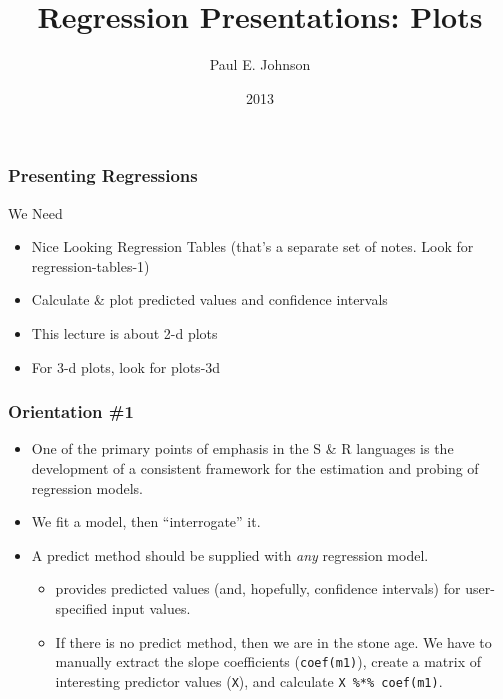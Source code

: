 \documentclass[10pt,english]{beamer}
\def\lyxframeend{} %
\def\Sweavesize{\normalsize}
\def\Rcolor{\color{black}}
\def\Rbackground{\color[gray]{0.95}}
\newcommand\makebeamertitle{\frame{\maketitle}}%
\begin{document}

\def\Sweavesize{\scriptsize} 
\def\Rcolor{\color{black}} 
\def\Rbackground{\color[gray]{0.97}}




\title[Descriptive]{Regression Presentations: Plots }


\author{Paul E. Johnson \and {}}




\date[2013]{2013}

\makebeamertitle

\lyxframeend{}


\begin{frame}

\frametitle{Presenting Regressions}

We Need
\begin{itemize}
\item Nice Looking Regression Tables (that's a separate set of notes. Look
for regression-tables-1)
\item Calculate \& plot predicted values and confidence intervals
\item This lecture is about 2-d plots
\item For 3-d plots, look for plots-3d
\end{itemize}
\end{frame}

\begin{frame}
\frametitle{Orientation \#1}
\begin{itemize}
\item One of the primary points of emphasis in the S \& R languages is the
development of a consistent framework for the estimation and probing
of regression models.
\item We fit a model, then ``interrogate'' it.
\item A predict method should be supplied with \emph{any }regression model. 

\begin{itemize}
\item provides predicted values (and, hopefully, confidence intervals) for
user-specified input values. 
\item If there is no predict method, then we are in the stone age. We have
to manually extract the slope coefficients (\texttt{coef(m1)}), create
a matrix of interesting predictor values (\texttt{X}), and calculate
\texttt{X \%*\% coef(m1)}. 
\end{itemize}
\end{itemize}
\end{frame}
\end{document}
